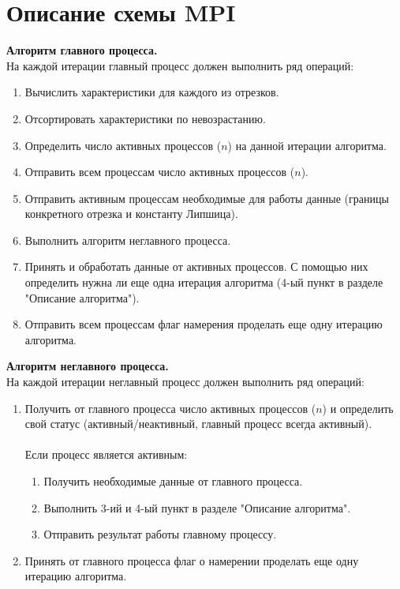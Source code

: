 \documentclass[14pt, a4paper]{extarticle}
\begin{document}
	\newpage

	\section{Описание схемы MPI}

	\textbf{Алгоритм главного процесса.}\\
	На каждой итерации главный процесс должен выполнить ряд операций:
	\begin{enumerate}
		\item Вычислить характеристики для каждого из отрезков.
		\item Отсортировать характеристики по невозрастанию.
		\item Определить число активных процессов ($n$) на данной итерации алгоритма.
		\item Отправить всем процессам число активных процессов ($n$).
		\item Отправить активным процессам необходимые для работы данные (границы конкретного отрезка и константу Липшица).
		\item Выполнить алгоритм неглавного процесса.
		\item Принять и обработать данные от активных процессов. С помощью них определить нужна ли еще одна итерация алгоритма (4-ый пункт в разделе "Описание алгоритма").
		\item Отправить всем процессам флаг намерения проделать еще одну итерацию алгоритма.
	\end{enumerate}

	\textbf{Алгоритм неглавного процесса.}\\
	На каждой итерации неглавный процесс должен выполнить ряд операций:
	\begin{enumerate}
		\item Получить от главного процесса число активных процессов ($n$) и определить свой статус (активный/неактивный, главный процесс всегда активный).\\\\
		Если процесс является активным:
		\begin{enumerate}
			\item Получить необходимые данные от главного процесса.
			\item Выполнить 3-ий и 4-ый пункт в разделе "Описание алгоритма".
			\item Отправить результат работы главному процессу.
  		\end{enumerate}
		\item Принять от главного процесса флаг о намерении проделать еще одну итерацию алгоритма.
	\end{enumerate}
\end{document}
